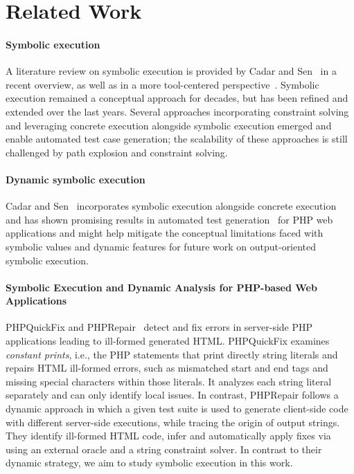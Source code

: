 \section{Related Work} \label{sec:related_work}

\paragraph{Symbolic execution}
A literature review on symbolic execution is provided by Cadar and Sen~\cite{CadarSen2013} in a
recent overview, as well as in a more
tool-centered perspective~\cite{Cadar2011}.
%
Symbolic execution \cite{King1976,Darringer1978} remained a
conceptual approach for decades, but has been refined and extended
over the last years. Several approaches incorporating constraint
solving and leveraging concrete execution alongside symbolic execution
emerged and enable automated test case generation; the scalability of
these approaches is still challenged by path explosion and constraint
solving.

\paragraph{Dynamic symbolic execution} Cadar and Sen~\cite{CadarSen2013} incorporates symbolic execution
alongside concrete execution and has shown promising results in
automated test
generation~\cite{artzi_finding_2008,artzi-tse10,DynamicWassermann}
for PHP web applications and might help mitigate the conceptual
limitations faced with symbolic values and dynamic features for future
work on output-oriented symbolic execution.

\paragraph{Symbolic Execution and Dynamic Analysis for PHP-based Web Applications}
PHPQuickFix and PHPRepair~\cite{ibm-icse12} detect and fix errors in
server-side PHP applications leading to ill-formed generated HTML.
PHPQuickFix examines {\em constant prints}, i.e., the PHP statements
that print directly string literals and repairs HTML ill-formed
errors, such as mismatched start and end tags and missing special
characters within those literals. It analyzes each string literal
separately and can only identify local issues. In contrast, PHPRepair
follows a dynamic approach in which a given test suite is used to
generate client-side code with different server-side executions, while
tracing the origin of output strings.
They identify ill-formed HTML code, infer and automatically apply
fixes via using an external oracle and a string constraint solver.  In
contrast to their dynamic strategy, we aim to study symbolic execution
in this work.

